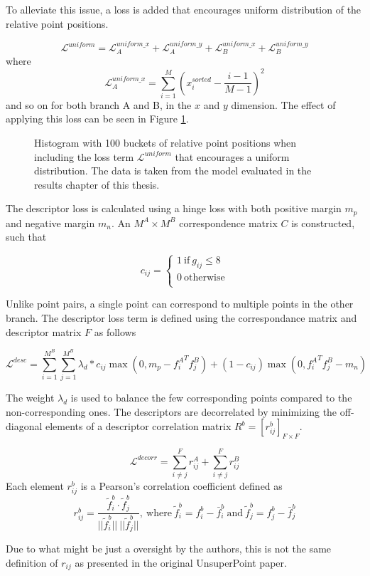 To alleviate this issue, a loss is added that encourages uniform distribution of the relative point positions.


\[
\mathcal{L}^{uniform}=\mathcal{L}^{uniform\_x}_A+\mathcal{L}^{uniform\_y}_A+\mathcal{L}^{uniform\_x}_B+\mathcal{L}^{uniform\_y}_B
\]
where
\[
\mathcal{L}^{uniform\_x}_A=\sum_{i=1}^M\left(x_i^{sorted}-\frac{i-1}{M-1}\right)^2
\]
and so on for both branch A and B, in the $x$ and $y$ dimension. The effect of applying this loss can be seen in Figure \ref{fig:hist-unixy}.

\begin{figure}[H]
	\begin{center}
		
	\end{center}
	\caption{Histogram with 100 buckets of relative point positions when including the loss term $\mathcal{L}^{uniform}$ that encourages a uniform distribution. The data is taken from the model evaluated in the results chapter of this thesis.}
	\label{fig:hist-unixy}
\end{figure}

The descriptor loss is calculated using a hinge loss with both positive margin $m_p$ and negative margin $m_n$. An $M^A\times M^B$ correspondence matrix $C$ is constructed, such that

\[
c_{ij}=
\begin{cases}
1\ \text{if}\ g_{ij}\le 8 \\
0\ \text{otherwise} \\
\end{cases}
\]

Unlike point pairs, a single point can correspond to multiple points in the other branch. The descriptor loss term is defined using the correspondance matrix and descriptor matrix $F$ as follows

\[
\mathcal{L}^{desc}=\sum^{M^B}_{i=1}\sum^{M^B}_{j=1}\lambda_d*c_{ij}\max\left(0,m_p-{f_i^A}^Tf_j^B\right)+(1-c_{ij})\max\left(0,{f_i^A}^Tf_j^B-m_n\right)
\]

The weight $\lambda_d$ is used to balance the few corresponding points compared to the non-corresponding ones. The descriptors are decorrelated by minimizing the off-diagonal elements of a descriptor correlation matrix $R^b=[r^b_{ij}]_{F\times F}$.

\[
\mathcal{L}^{decorr}=\sum^F_{i\neq j}r_{ij}^A+\sum^F_{i\neq j}r_{ij}^B
\]
Each element $r^b_{ij}$ is a Pearson's correlation coefficient\cite{pearsons} defined as
\[
r^b_{ij}=
\frac{ \tilde{f}_i^b \cdot \tilde{f}_j^b }{
||\tilde{f}_i^b||\ ||\tilde{f}_j^b||
}
,\ \text{where}\ 
\tilde{f}_i^b=f_i^b-\bar{f}^b_i
\ \text{and}\ 
\tilde{f}_j^b=f_j^b-\bar{f}^b_j
\]

Due to what might be just a oversight by the authors, this is not the same definition of $r_{ij}$ as presented in the original UnsuperPoint paper.